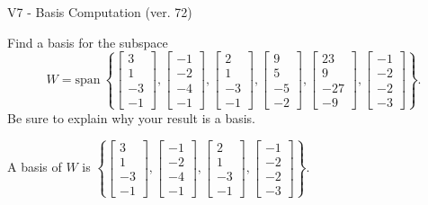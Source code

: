\begin{exercise}
  \begin{exerciseTitle}V7 - Basis Computation (ver. 72)\end{exerciseTitle}
  \begin{exerciseStatement}
    Find a basis for the subspace 
\[W=\mathrm{span}\ \left\{\left[\begin{array}{r}
3 \\
1 \\
-3 \\
-1
\end{array}\right] , \left[\begin{array}{r}
-1 \\
-2 \\
-4 \\
-1
\end{array}\right] , \left[\begin{array}{r}
2 \\
1 \\
-3 \\
-1
\end{array}\right] , \left[\begin{array}{r}
9 \\
5 \\
-5 \\
-2
\end{array}\right] , \left[\begin{array}{r}
23 \\
9 \\
-27 \\
-9
\end{array}\right] , \left[\begin{array}{r}
-1 \\
-2 \\
-2 \\
-3
\end{array}\right]\right\}.\]
 Be sure to explain why your result is a basis.


  \end{exerciseStatement}
  \begin{exerciseAnswer}
   A basis of \(W\) is  \(\left\{\left[\begin{array}{r}
3 \\
1 \\
-3 \\
-1
\end{array}\right] , \left[\begin{array}{r}
-1 \\
-2 \\
-4 \\
-1
\end{array}\right] , \left[\begin{array}{r}
2 \\
1 \\
-3 \\
-1
\end{array}\right] , \left[\begin{array}{r}
-1 \\
-2 \\
-2 \\
-3
\end{array}\right]\right\}\).
  


  \end{exerciseAnswer}
\end{exercise}